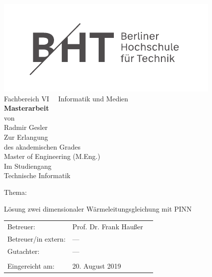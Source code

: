\documentclass[bachelor,german]{hgbthesis}
\begin{document}
\frontmatter %
\thispagestyle{empty}
\begin{centering}
	
	\includegraphics[width=.5\linewidth]{bht_logos/BHT_Logo_kompakt_horizontal_Anthrazit_transparent}\\
	\vspace*{60pt}
	Fachbereich VI \ \ Informatik und Medien\\
	\vspace*{30pt}
	\textbf{Masterarbeit}\\
	\vspace*{40pt}
	von\\
	\vspace*{20pt}
	Radmir Gesler\\
	\vspace*{30pt}
	Zur Erlangung \\
	des akademischen Grades\\
	Master of Engineering (M.Eng.)\\
	\vspace*{40pt}
	Im Studiengang\\
	Technische Informatik
	
\end{centering}
\vspace*{40pt}
Thema: 
\begin{center}
	Lösung zwei dimensionaler Wärmeleitungsgleichung mit PINN
\end{center}

\vspace*{40pt}
\begin{tabular}{l l  p{4pt}}
	Betreuer: & Prof. Dr. Frank Haußer  \\
	Betreuer/in extern: & ---\\
	Gutachter: & ---  \\
	\\
	Eingereicht am: & 20. August 2019 \\
\end{tabular}


\end{document}
